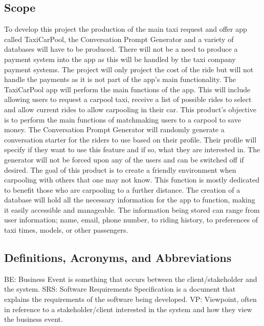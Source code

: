 \documentclass[]{article}
\begin{document}
\subsection{Scope}
\label{sub:scope}
To develop this project the production of the main taxi request and offer app called TaxiCarPool, the Conversation Prompt Generator and a variety of databases will have to be produced. There will not be a need to produce a payment system into the app as this will be handled by the taxi company payment systems. The project will only project the cost of the ride but will not handle the payments as it is not part of the app’s main functionality.
\newline \newline
The TaxiCarPool app will perform the main functions of the app. This will include allowing users to request a carpool taxi, receive a list of possible rides to select and allow current rides to allow carpooling in their car. This product’s objective is to perform the main functions of matchmaking users to a carpool to save money. 
\newline \newline
The Conversation Prompt Generator will randomly generate a conversation starter for the riders to use based on their profile. Their profile will specify if they want to use this feature and if so, what they are interested in. The generator will not be forced upon any of the users and can be switched off if desired. The goal of this product is to create a friendly environment when carpooling with others that one may not know. This function is mostly dedicated to benefit those who are carpooling to a further distance.
\newline \newline
The creation of a database will hold all the necessary information for the app to function, making it easily accessible and manageable. The information being stored can range from user information; name, email, phone number, to riding history, to preferences of taxi times, models, or other passengers. 

\subsection{Definitions, Acronyms, and Abbreviations}
\label{sub:definitions_acronyms_and_abbreviations}
BE: Business Event is something that occurs between the client/stakeholder and the system. 
\newline \newline
SRS: Software Requirements Specification is a document that explains the requirements of the software being developed.
\newline \newline
VP: Viewpoint, often in reference to a stakeholder/client interested in the system and how they view the business event.
\end{document}
